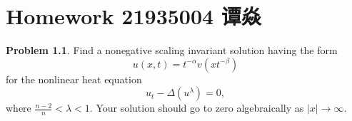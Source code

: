\documentclass[a4paper]{book}
\makeatletter
\newcommand{\voidenvironment}[1]{%
  \expandafter\providecommand\csname env@#1@save@env\endcsname{}%
  \expandafter\providecommand\csname env@#1@process\endcsname{}%
  \@ifundefined{#1}{}{\RenewEnviron{#1}{}}%
}
\numberwithin{equation}{chapter}
\theoremstyle{definition}
\newtheorem{pro}[exm]{Problem}
\makeatother
\begin{document}
\pagestyle{empty}
% 



\setcounter{chapter}{9}




\chapter{Homework 21935004 谭焱}


\begin{pro}
  Find a nonegative scaling invariant solution having the form
  \[u(x,t) = t^{-\alpha} v(x t^{-\beta})\]
  for the nonlinear heat equation
  \[u_t - \Delta(u^\lambda) = 0,\]
  where $\frac{n-2}{n} < \lambda < 1$. Your solution should go to zero algebraically as $\left| x \right| \rightarrow \infty$.
\end{pro}
\end{document}

